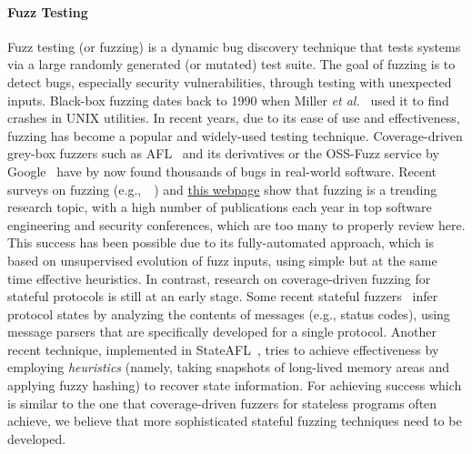 \documentclass[11pt]{article}
\newcommand{\mycomment}[1]{}
\newcommand{\FIX}[1]{\textcolor{red}{\textbf{#1}}}
\newcommand{\UNREVISED}[1]{\textcolor{DarkGrey}{#1}}
\newcommand{\system}[1]{\mbox{\textsf{#1}}}
\newcommand{\myparagraph}{}
\let\myparagraph=\paragraph
\renewcommand{\paragraph}{\vspace{-3mm}\myparagraph}
\newcommand{\eg}{e.\/g.,\ }
\newcommand{\etal}{\textit{et al.}}
\begin{document}
\paragraph{Fuzz Testing}
Fuzz testing (or fuzzing) is a dynamic bug discovery technique that tests
systems via a large randomly generated (or mutated) test suite. The goal of
fuzzing is to detect bugs, especially security vulnerabilities, through
testing with unexpected inputs. Black-box fuzzing dates back to 1990 when
Miller \etal~\cite{Fuzz@CACM-90} used it to find crashes in UNIX utilities. In
recent years, due to its ease of use and effectiveness, fuzzing has become a
popular and widely-used testing technique. Coverage-driven grey-box fuzzers
such as \system{AFL}~\cite{AFL} and its derivatives or the OSS-Fuzz service by
Google~\cite{OSS-Fuzz@USENIX-17} have by now found thousands of bugs in
real-world software. Recent surveys on fuzzing
(\eg~\cite{FuzzingSurvey@TSE-21,FuzzingRoadmap@CompSurveys-22}) and
\href{https://wcventure.github.io/FuzzingPaper/}{this webpage} show that
fuzzing is a trending research topic, with a high number of publications each
year in top software engineering and security conferences, which are too many
to properly review here.
%
This success has been possible due to its fully-automated approach, which is
based on unsupervised evolution of fuzz inputs, using simple but at the same
time effective heuristics. In contrast, research on coverage-driven fuzzing
for stateful protocols is still at an early stage.
%
Some recent stateful fuzzers~\cite{AFLNET@ICST-20,Snipuzz@CCS-21} infer
protocol states by analyzing the contents of messages (e.g., status codes),
using message parsers that are specifically developed for a single protocol.
Another recent technique, implemented in
\system{StateAFL}~\cite{StateAFL@ESE-22}, tries to achieve effectiveness by
employing \emph{heuristics} (namely, taking snapshots of long-lived memory
areas and applying fuzzy hashing) to recover state information.
%
For achieving success which is similar to the one that coverage-driven fuzzers
for stateless programs often achieve, we believe that more sophisticated
stateful fuzzing techniques need to be developed.


\mycomment{
\section{Significance and Scientific Novelty} \label{sec:significance}
\FIX{No text here yet :-(}

\UNREVISED{However, it may be possibe to skip this section if we manage to have short ``Significance'' paragraphs for each of the six tasks in the next section.}
}
\end{document}
